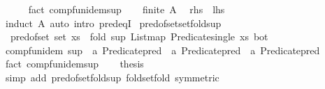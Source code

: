 \begin{isabellebody}
\ \ \ \ \isamarkupfalse%
\ {\isacharparenleft}{\kern0pt}fact\ comp{\isacharunderscore}{\kern0pt}fun{\isacharunderscore}{\kern0pt}idem{\isacharunderscore}{\kern0pt}sup{\isacharparenright}{\kern0pt}\isanewline
\ \ \isamarkupfalse%
\ {\isacartoucheopen}finite\ A{\isacartoucheclose}\ \isamarkupfalse%
\ {\isachardoublequoteopen}{\isacharquery}{\kern0pt}rhs\ {\isacharequal}{\kern0pt}\ {\isacharquery}{\kern0pt}lhs{\isachardoublequoteclose}\ \isamarkupfalse%
\ {\isacharparenleft}{\kern0pt}induct\ A{\isacharparenright}{\kern0pt}\ {\isacharparenleft}{\kern0pt}auto\ intro{\isacharbang}{\kern0pt}{\isacharcolon}{\kern0pt}\ pred{\isacharunderscore}{\kern0pt}eqI{\isacharparenright}{\kern0pt}\isanewline
{}\isamarkupfalse%
%
\endisatagproof
{\isafoldproof}%
%
\isadelimproof
\isanewline
%
\endisadelimproof
\isanewline
{}\isamarkupfalse%
\ pred{\isacharunderscore}{\kern0pt}of{\isacharunderscore}{\kern0pt}set{\isacharunderscore}{\kern0pt}set{\isacharunderscore}{\kern0pt}fold{\isacharunderscore}{\kern0pt}sup{\isacharcolon}{\kern0pt}\isanewline
\ \ {\isachardoublequoteopen}pred{\isacharunderscore}{\kern0pt}of{\isacharunderscore}{\kern0pt}set\ {\isacharparenleft}{\kern0pt}set\ xs{\isacharparenright}{\kern0pt}\ {\isacharequal}{\kern0pt}\ fold\ sup\ {\isacharparenleft}{\kern0pt}List{\isachardot}{\kern0pt}map\ Predicate{\isachardot}{\kern0pt}single\ xs{\isacharparenright}{\kern0pt}\ bot{\isachardoublequoteclose}\isanewline
%
\isadelimproof
%
\endisadelimproof
%
\isatagproof
{}\isamarkupfalse%
\ {\isacharminus}{\kern0pt}\isanewline
\ \ \isamarkupfalse%
\ comp{\isacharunderscore}{\kern0pt}fun{\isacharunderscore}{\kern0pt}idem\ {\isachardoublequoteopen}sup\ {\isacharcolon}{\kern0pt}{\isacharcolon}{\kern0pt}\ {\isacharprime}{\kern0pt}a\ Predicate{\isachardot}{\kern0pt}pred\ {\isasymRightarrow}\ {\isacharprime}{\kern0pt}a\ Predicate{\isachardot}{\kern0pt}pred\ {\isasymRightarrow}\ {\isacharprime}{\kern0pt}a\ Predicate{\isachardot}{\kern0pt}pred{\isachardoublequoteclose}\isanewline
\ \ \ \ \isamarkupfalse%
\ {\isacharparenleft}{\kern0pt}fact\ comp{\isacharunderscore}{\kern0pt}fun{\isacharunderscore}{\kern0pt}idem{\isacharunderscore}{\kern0pt}sup{\isacharparenright}{\kern0pt}\isanewline
\ \ \isamarkupfalse%
\ {\isacharquery}{\kern0pt}thesis\ \isamarkupfalse%
\ {\isacharparenleft}{\kern0pt}simp\ add{\isacharcolon}{\kern0pt}\ pred{\isacharunderscore}{\kern0pt}of{\isacharunderscore}{\kern0pt}set{\isacharunderscore}{\kern0pt}fold{\isacharunderscore}{\kern0pt}sup\ fold{\isacharunderscore}{\kern0pt}set{\isacharunderscore}{\kern0pt}fold\ {\isacharbrackleft}{\kern0pt}symmetric{\isacharbrackright}{\kern0pt}{\isacharparenright}{\kern0pt}\isanewline

\end{isabellebody}
